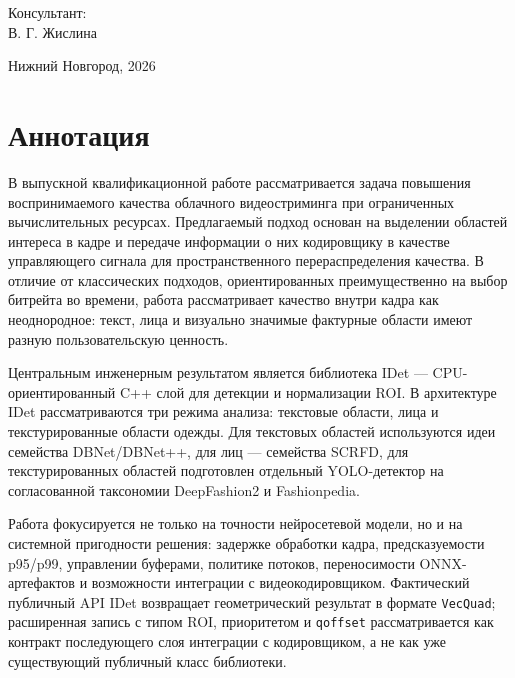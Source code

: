 \documentclass[12pt,a4paper,oneside,openany]{report}
\begin{document}
\begin{titlepage}
\begin{minipage}[t]{0.80\linewidth}
\begin{minipage}[t]{0.45\linewidth}
      Консультант:\\
      В. Г. Жислина
    \end{minipage}
  \end{minipage}

  \vfill

  \begin{center}
    Нижний Новгород, 2026
  \end{center}

\end{titlepage}

\setcounter{page}{2}


\chapter*{Аннотация}

В выпускной квалификационной работе рассматривается задача повышения воспринимаемого качества
облачного видеостриминга при ограниченных вычислительных ресурсах. Предлагаемый подход основан
на выделении областей интереса в кадре и передаче информации о них кодировщику в качестве
управляющего сигнала для пространственного перераспределения качества. В отличие от классических
подходов, ориентированных преимущественно на выбор битрейта во времени, работа рассматривает
качество внутри кадра как неоднородное: текст, лица и визуально значимые фактурные области имеют
разную пользовательскую ценность.

Центральным инженерным результатом является библиотека IDet --- CPU-ориентированный C++ слой для
детекции и нормализации ROI. В архитектуре IDet рассматриваются три режима анализа: текстовые
области, лица и текстурированные области одежды. Для текстовых областей используются идеи
семейства DBNet/DBNet++, для лиц --- семейства SCRFD, для текстурированных областей подготовлен
отдельный YOLO-детектор на согласованной таксономии DeepFashion2 и Fashionpedia.

Работа фокусируется не только на точности нейросетевой модели, но и на системной пригодности
решения: задержке обработки кадра, предсказуемости p95/p99, управлении буферами, политике
потоков, переносимости ONNX-артефактов и возможности интеграции с видеокодировщиком. Фактический
публичный API IDet возвращает геометрический результат в формате \texttt{VecQuad}; расширенная
запись с типом ROI, приоритетом и \texttt{qoffset} рассматривается как контракт последующего
слоя интеграции с кодировщиком, а не как уже существующий публичный класс библиотеки.
\end{document}
